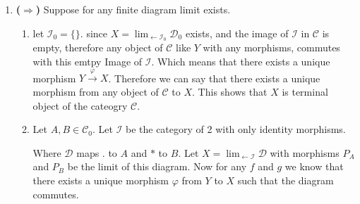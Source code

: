 \begin{enumerate}[label =]
    \item \textbf{($\Rightarrow$)}
    Suppose for any finite diagram limit exists.
            \begin{enumerate}[label=(\textit{\roman*})]
                \item 
                    let $\mathcal I_0 = \{\}$.
                    since $X = \lim_{\leftarrow \mathcal I_0} \mathcal D_0$
                    exists, and the image of $\mathcal I$ in $\mathcal C$ is empty,
                    therefore any object of $\mathcal C$ like $Y$ with any morphisms, commutes with this emtpy Image of $\mathcal I$. Which means that there exists a unique morphism $Y \xrightarrow{\varphi} X$.
                    Therefore we can say that there exists a unique morphism from any object of $\mathcal C$ to $X$. This shows that $X$ is terminal object of the cateogry $\mathcal C$.
                \item 
                    Let $A, B \in \mathcal C_0$. Let $\mathcal I$ be the category of 2 with only identity morphisms.
                    \begin{center}
                        
                    \end{center}
                    Where $\mathcal D$ maps $.$ to $A$ and $*$ to $B$. Let $X = \lim_{\leftarrow \mathcal{I}} \mathcal D$ with morphisms $P_A$ and $P_B$ be the limit of this diagram.
                    Now for any $f$ and $g$ we know that there exists a unique morphism $\varphi$ from $Y$ to $X$ such that the diagram commutes.
                    \begin{center}

\end{center}
\end{enumerate}
\end{enumerate}
